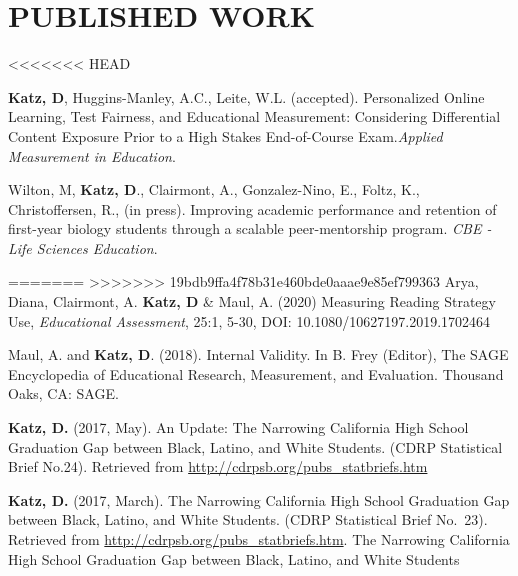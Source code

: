 \documentclass[12pt, oneside,]{memoir}
\begin{document}
\hypertarget{published-work}{%
\section{PUBLISHED WORK}\label{published-work}}
\begin{hangparas}{.25in}{1}
<<<<<<< HEAD

\textbf{Katz, D}, Huggins-Manley, A.C., Leite, W.L. (accepted). Personalized Online Learning, Test Fairness, and Educational Measurement: Considering Differential Content Exposure Prior to a High Stakes End-of-Course Exam.\emph{Applied Measurement in Education}.

Wilton, M, \textbf{Katz, D}., Clairmont, A., Gonzalez-Nino, E., Foltz, K., Christoffersen, R., (in press). Improving academic performance and retention of first-year biology students through a scalable peer-mentorship program. \emph{CBE - Life Sciences Education}.

=======
>>>>>>> 19bdb9ffa4f78b31e460bde0aaae9e85ef799363
Arya, Diana, Clairmont, A. \textbf{Katz, D} \& Maul, A. (2020) Measuring
Reading Strategy Use, \emph{Educational  Assessment}, 25:1, 5-30, DOI:
10.1080/10627197.2019.1702464

\noindent Maul, A. and \textbf{Katz, D}. (2018). Internal Validity. In B. Frey
(Editor), The SAGE Encyclopedia of Educational Research, Measurement,
and Evaluation. Thousand Oaks, CA: SAGE.

\noindent \textbf{Katz, D.} (2017, May). An Update: The Narrowing California High
School Graduation Gap between Black, Latino, and White Students. (CDRP
Statistical Brief No.24). Retrieved from
\url{http://cdrpsb.org/pubs_statbriefs.htm}

\noindent \textbf{Katz, D.} (2017, March). The Narrowing California High School
Graduation Gap between Black, Latino, and White Students. (CDRP
Statistical Brief No.~23). Retrieved from
\url{http://cdrpsb.org/pubs_statbriefs.htm}. The Narrowing California
High School Graduation Gap between Black, Latino, and White Students
\end{hangparas}
\vspace{4mm}
\end{document}
